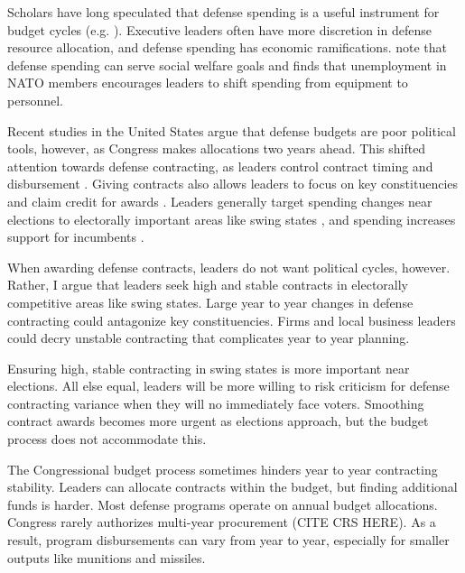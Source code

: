 \documentclass[12pt]{article}
\begin{document}
Scholars have long speculated that defense spending is a useful instrument for budget cycles (e.g. \cite{Tufte1978, Mintz1988}).
Executive leaders often have more discretion in defense resource allocation, and defense spending has economic ramifications.
\citet{WhittenWilliams2011} note that defense spending can serve social welfare goals and \citet{Becker2021} finds that unemployment in NATO members encourages leaders to shift spending from equipment to personnel.


Recent studies in the United States argue that defense budgets are poor political tools, however, as Congress makes allocations two years ahead.
This shifted attention towards defense contracting, as leaders control contract timing and disbursement \citep{Mayer1995, DerouenHeo2000}.
Giving contracts also allows leaders to focus on key constituencies and claim credit for awards \citep{DerouenHeo2000}. 
Leaders generally target spending changes near elections to electorally important areas like swing states \citep{KrinerReeves2015}, and spending increases support for incumbents \citep{KrinerReeves2012}.


When awarding defense contracts, leaders do not want political cycles, however. 
Rather, I argue that leaders seek high and stable contracts in electorally competitive areas like swing states. 
Large year to year changes in defense contracting could antagonize key constituencies. 
Firms and local business leaders could decry unstable contracting that complicates year to year planning. 


Ensuring high, stable contracting in swing states is more important near elections. 
All else equal, leaders will be more willing to risk criticism for defense contracting variance when they will no immediately face voters. 
Smoothing contract awards becomes more urgent as elections approach, but the budget process does not accommodate this. 


The Congressional budget process sometimes hinders year to year contracting stability. 
Leaders can allocate contracts within the budget, but finding additional funds is harder. 
Most defense programs operate on annual budget allocations.
Congress rarely authorizes multi-year procurement (CITE CRS HERE). 
As a result, program disbursements can vary from year to year, especially for smaller outputs like munitions and missiles. 
\end{document}
